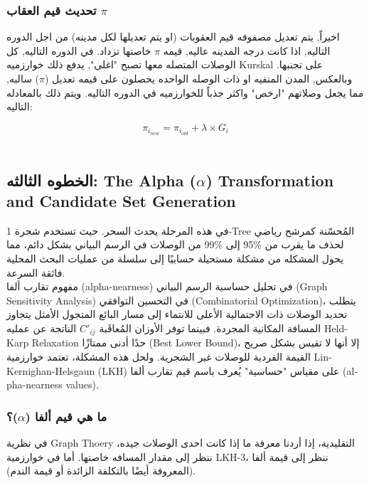 \documentclass{article}
\newcommand{\en}[1]{\textenglish{#1}}
\begin{document}
\subsubsection{تحديث قيم العقاب $\pi$}
اخيراً, يتم تعديل مصفوفه قيم العقوبات (او يتم تعديلها لكل مدينه) من اجل الدوره التاليه, اذا كانت درجه المدينه عاليه, قيمه $\pi$ خاصتها تزداد. في الدوره التاليه, كل الوصلات المتصله معها تصبح "اغلى", يدفع ذلك خوارزميه \en{Kurskal} على تجنبها. وبالعكس, المدن المنفيه او ذات الوصله الواحده يحصلون على قيمه تعديل ($\pi$) سالبه, مما يجعل وصلاتهم "ارخص" واكثر جذباً للخوارزميه في الدوره التاليه. ويتم ذلك بالمعادله التاليه:

{\LARGE$$
\pi_{i_{new}} = \pi_{i_{old}} + \lambda \times G_i
$$}\\

\subsection{الخطوه الثالثه: \en{The Alpha ($\alpha$) Transformation and Candidate Set Generation}}

في هذه المرحلة يحدث السحر. حيث تستخدم شجرة \en{1-Tree} المُحسّنة كمرشح رياضي لحذف ما يقرب من \%95 إلى \%99 من الوصلات في الرسم البياني بشكل دائم، مما يحول المشكله من مشكلة مستحيلة حسابيًا إلى سلسلة من عمليات البحث المحلية فائقة السرعة.\\

مفهوم تقارب ألفا (\en{alpha-nearness}) في تحليل حساسية الرسم البياني (\en{Graph Sensitivity Analysis}) في التحسين التوافقي (\en{Combinatorial Optimization})، يتطلب تحديد الوصلات ذات الاحتمالية الأعلى للانتماء إلى مسار البائع المتجول الأمثل يتجاوز المسافة المكانية المجردة. فبينما توفر الأوزان المُعاقَبة $C'_{ij}$ الناتجة عن عمليه \en{Held-Karp Relaxation} حدًا أدنى ممتازًا (\en{Best Lower Bound})، إلا أنها لا تقيس بشكل صريح القيمة الفردية للوصلات غير الشجرية. ولحل هذه المشكلة، تعتمد خوارزمية \en{Lin-Kernighan-Helsgaun (LKH)} على مقياس "حساسية" يُعرف باسم قيم تقارب ألفا (\en{alpha-nearness values}).\\

\subsubsection{ما هي قيم ألفا ($\alpha$)؟}
في نظرية \en{Graph Thoery} التقليدية، إذا أردنا معرفة ما إذا كانت احدى الوصلات جيده، ننظر إلى مقدار المسافه خاصتها. ​​أما في خوارزمية \en{LKH-3}، ننظر إلى قيمة ألفا (المعروفة أيضًا بالتكلفة الزائدة أو قيمة الندم).\\
\end{document}
